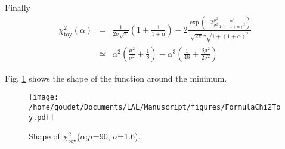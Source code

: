 Finally
\begin{equation}
\begin{array}{lcl}
\chi^2_{\text{toy}}(\alpha) &=& \frac{1}{2\sigma\sqrt{\pi}}(1 + \frac{1}{1+\alpha} ) -2   \frac{\exp\left(-2 \frac{\mu^2}{\sigma^2} \frac{\alpha^2}{1+(1+\alpha)^2}\right)}{\sqrt{2\pi}\sigma\sqrt{1+(1+\alpha)^2}}  \\
&\simeq & \alpha^2( \frac{\mu^2}{\sigma^2} + \frac{1}{8}) - \alpha^3 ( \frac{1}{48} + \frac{3\mu^2}{2\sigma^2})
\end{array}
\end{equation}


Fig. \ref{fig:orgda84955} shows the shape of the function around the minimum.

\begin{figure}[htbp]
\centering
\texttt{[image: /home/goudet/Documents/LAL/Manuscript/figures/FormulaChi2Toy.pdf]}
\caption{\label{fig:orgda84955}
Shape of \(\chi^{\text{2}}_{\text{toy}}\)(\(\alpha\);\(\mu\)=90, \(\sigma\)=1.6).}
\end{figure}
